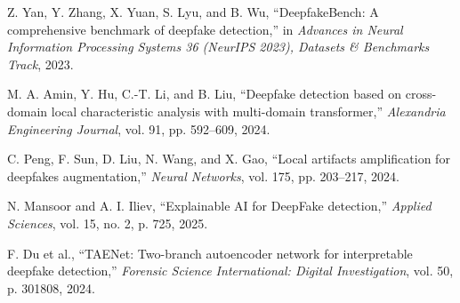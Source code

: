 \documentclass[conference]{IEEEtran}
\begin{document}
\begin{thebibliography}{99}
Z. Yan, Y. Zhang, X. Yuan, S. Lyu, and B. Wu, ``DeepfakeBench: A comprehensive benchmark of deepfake detection,'' in \textit{Advances in Neural Information Processing Systems 36 (NeurIPS 2023), Datasets \& Benchmarks Track}, 2023.

M. A. Amin, Y. Hu, C.-T. Li, and B. Liu, ``Deepfake detection based on cross-domain local characteristic analysis with multi-domain transformer,'' \textit{Alexandria Engineering Journal}, vol. 91, pp. 592--609, 2024.

C. Peng, F. Sun, D. Liu, N. Wang, and X. Gao, ``Local artifacts amplification for deepfakes augmentation,'' \textit{Neural Networks}, vol. 175, pp. 203--217, 2024.

N. Mansoor and A. I. Iliev, ``Explainable AI for DeepFake detection,'' \textit{Applied Sciences}, vol. 15, no. 2, p. 725, 2025.

F. Du et al., ``TAENet: Two-branch autoencoder network for interpretable deepfake detection,'' \textit{Forensic Science International: Digital Investigation}, vol. 50, p. 301808, 2024.

\end{thebibliography}
\end{document}
